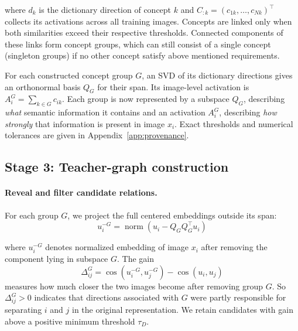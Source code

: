 \documentclass{article}
\begin{document}
where $d_k$ is the dictionary direction of concept $k$ and $C_{:k}=(c_{1k},\ldots,c_{Nk})^\top$ collects its activations across all training images. Concepts are linked only when both similarities exceed their respective thresholds. Connected components of these links form concept groups, which can still consist of a single concept (singleton groups) if no other concept satisfy above mentioned requirements.

For each constructed concept group $G$, an SVD of its dictionary directions gives an orthonormal basis $Q_G$ for their span. Its image-level activation is $A_i^G=\sum_{k\in G}c_{ik}$. Each group is now represented by a subspace $Q_G$, describing \emph{what} semantic information it contains and an activation $A_i^G$, describing \emph{how strongly} that information is present in image $x_i$. Exact thresholds and numerical tolerances are given in Appendix~\ref{app:provenance}.

\subsection{Stage 3: Teacher-graph construction}

\paragraph{Reveal and filter candidate relations.}
For each group $G$, we project the full centered embeddings outside its span:
\begin{equation}
 u_i^{-G}=\operatorname{norm}(u_i-Q_GQ_G^\top u_i)
\end{equation}

where $u_i^{-G}$ denotes normalized embedding of image $x_i$ after removing the component lying in subspace $G$. The gain
\begin{equation}
    \Delta_{ij}^{G} = \cos(u_i^{-G},u_j^{-G})-\cos(u_i,u_j)
\end{equation}
measures how much closer the two images become after removing group $G$. So $\Delta_{ij}^{G}>0$ indicates that directions associated with $G$ were partly responsible for separating $i$ and $j$ in the original representation.
We retain candidates with gain above a positive minimum threshold $\tau_D$.
\end{document}
